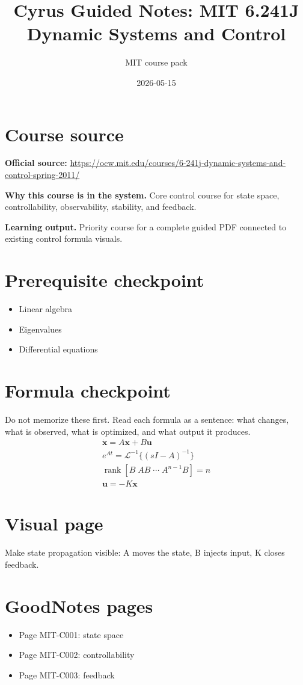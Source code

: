 \documentclass[11pt]{article}
\title{Cyrus Guided Notes: MIT 6.241J Dynamic Systems and Control}
\author{MIT course pack}
\date{2026-05-15}
\begin{document}
\maketitle

\section*{Course source}
\textbf{Official source:} \url{https://ocw.mit.edu/courses/6-241j-dynamic-systems-and-control-spring-2011/}

\textbf{Why this course is in the system.} Core control course for state space, controllability, observability, stability, and feedback.

\textbf{Learning output.} Priority course for a complete guided PDF connected to existing control formula visuals.

\section*{Prerequisite checkpoint}
\begin{itemize}[leftmargin=1.4em]
  \item Linear algebra
  \item Eigenvalues
  \item Differential equations
\end{itemize}

\section*{Formula checkpoint}
Do not memorize these first. Read each formula as a sentence: what changes, what is observed, what is optimized, and what output it produces.
\begin{align*}
  \dot{\bm{x}}=A\bm{x}+B\bm{u}\\
  e^{At}=\mathcal{L}^{-1}\{(sI-A)^{-1}\}\\
  \operatorname{rank}[B\;AB\;\cdots\;A^{n-1}B]=n\\
  \bm{u}=-K\bm{x}
\end{align*}

\section*{Visual page}
Make state propagation visible: A moves the state, B injects input, K closes feedback.

\section*{GoodNotes pages}
\begin{itemize}[leftmargin=1.4em]
  \item Page MIT-C001: state space
  \item Page MIT-C002: controllability
  \item Page MIT-C003: feedback
\end{itemize}
\end{document}

